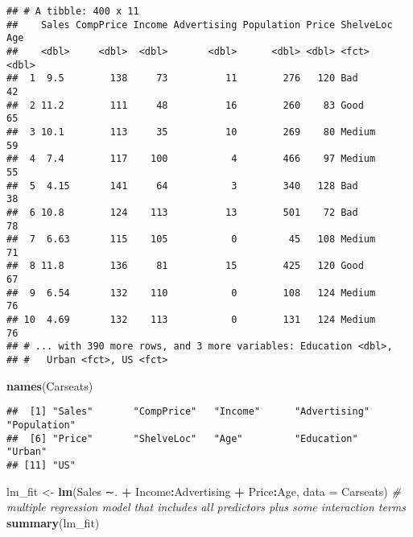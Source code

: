 \documentclass[]{article}
\newenvironment{Shaded}{\begin{snugshade}}{\end{snugshade}}
\newcommand{\CommentTok}[1]{\textcolor[rgb]{0.56,0.35,0.01}{\textit{#1}}}
\newcommand{\DataTypeTok}[1]{\textcolor[rgb]{0.13,0.29,0.53}{#1}}
\newcommand{\KeywordTok}[1]{\textcolor[rgb]{0.13,0.29,0.53}{\textbf{#1}}}
\newcommand{\NormalTok}[1]{#1}
\newcommand{\OperatorTok}[1]{\textcolor[rgb]{0.81,0.36,0.00}{\textbf{#1}}}
\newcommand{\StringTok}[1]{\textcolor[rgb]{0.31,0.60,0.02}{#1}}
\begin{document}
\begin{verbatim}
## # A tibble: 400 x 11
##    Sales CompPrice Income Advertising Population Price ShelveLoc   Age
##    <dbl>     <dbl>  <dbl>       <dbl>      <dbl> <dbl> <fct>     <dbl>
##  1  9.5        138     73          11        276   120 Bad          42
##  2 11.2        111     48          16        260    83 Good         65
##  3 10.1        113     35          10        269    80 Medium       59
##  4  7.4        117    100           4        466    97 Medium       55
##  5  4.15       141     64           3        340   128 Bad          38
##  6 10.8        124    113          13        501    72 Bad          78
##  7  6.63       115    105           0         45   108 Medium       71
##  8 11.8        136     81          15        425   120 Good         67
##  9  6.54       132    110           0        108   124 Medium       76
## 10  4.69       132    113           0        131   124 Medium       76
## # ... with 390 more rows, and 3 more variables: Education <dbl>,
## #   Urban <fct>, US <fct>
\end{verbatim}

\begin{Shaded}
\begin{Highlighting}[]
\KeywordTok{names}\NormalTok{(Carseats)}
\end{Highlighting}
\end{Shaded}

\begin{verbatim}
##  [1] "Sales"       "CompPrice"   "Income"      "Advertising" "Population" 
##  [6] "Price"       "ShelveLoc"   "Age"         "Education"   "Urban"      
## [11] "US"
\end{verbatim}

\begin{Shaded}
\begin{Highlighting}[]
\NormalTok{lm_fit <-}\StringTok{ }\KeywordTok{lm}\NormalTok{(Sales ∼. }\OperatorTok{+}\StringTok{ }\NormalTok{Income}\OperatorTok{:}\NormalTok{Advertising }\OperatorTok{+}\StringTok{ }\NormalTok{Price}\OperatorTok{:}\NormalTok{Age, }\DataTypeTok{data =}\NormalTok{ Carseats) }\CommentTok{# multiple regression model that includes all predictors plus some interaction terms}
\KeywordTok{summary}\NormalTok{(lm_fit)}
\end{Highlighting}
\end{Shaded}
\end{document}
